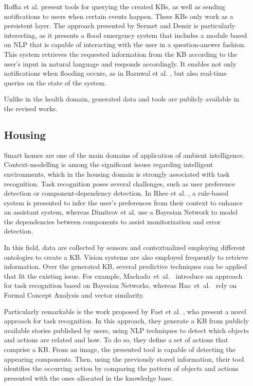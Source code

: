Roffia et al. \citep{roffiaetal} present tools for querying the created KBs, as well as sending notifications to users when certain events happen. These KBs only work as a persistent layer. The approach presented by Sermet and Demir \citep{sermetetal} is particularly interesting, as it presents a flood emergency system that includes a module based on NLP that is capable of interacting with the user in a question-answer fashion. This system retrieves the requested information from the KB according to the user's input in natural language and responds accordingly. It enables not only notifications when flooding occurs, as in Barnwal et al. \citep{barnwaletal}, but also real-time queries on the state of the system.

Unlike in the health domain, generated data and tools are publicly available in the revised works.

\subsection{Housing} 
Smart homes are one of the main domains of application of ambient intelligence. Context-modelling is among the significant issues regarding intelligent environments, which in the housing domain is strongly associated with task recognition. Task recognition poses several challenges, such as user preference detection or component-dependency detection. In Rhee et al. \citep{rheeetal}, a rule-based system is presented to infer the user's preferences from their context to enhance an assistant system, whereas Dimitrov et al. \citep{dimitrovetal} use a Bayesian Network to model the dependencies between components to assist monitorization and error detection.

In this field, data are collected by sensors and contextualized employing different ontologies to create a KB. Vision systems are also employed frequently to retrieve information. Over the generated KB, several predictive techniques can be applied that fit the existing issue. For example, Machado~et~al.~\citep{machadoetal} introduce an approach for task recognition based on Bayesian Networks, whereas Hao~et~al.~\citep{haoetal} rely on Formal Concept Analysis and vector similarity.

Particularly remarkable is the work proposed by Fast et al. \citep{fastetal}, who present a novel approach for task recognition. In this approach, they generate a KB from publicly available stories published by users, using NLP techniques to detect which objects and actions are related and how. To do so, they define a set of actions that comprise a KB. From an image, the presented tool is capable of detecting the appearing components. Then, using the previously stored information, their tool identifies the occurring action by comparing the pattern of objects and actions presented with the ones allocated in the knowledge base.

